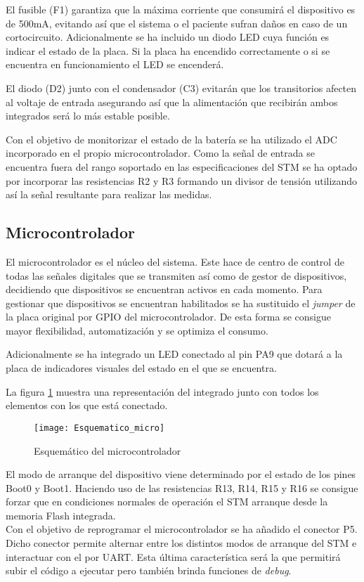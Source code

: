 El fusible (F1) garantiza que la máxima corriente que consumirá el dispositivo es de 500mA, evitando así que el sistema o el paciente sufran daños en caso de un cortocircuito. Adicionalmente se ha incluido un diodo \acrshort{LED} cuya función es indicar el estado de la placa. Si la placa ha encendido correctamente o si se encuentra en funcionamiento el \acrshort{LED} se encenderá.

El diodo (D2) junto con el condensador (C3) evitarán que los transitorios afecten al voltaje de entrada asegurando así que la alimentación que recibirán ambos integrados será lo más estable posible.

Con el objetivo de monitorizar el estado de la batería se ha utilizado el \acrshort{ADC} incorporado en el propio microcontrolador. Como la señal de entrada se encuentra fuera del rango soportado en las especificaciones del STM se ha optado por incorporar las resistencias R2 y R3 formando un divisor de tensión utilizando así la señal resultante para realizar las medidas.

\clearpage

\subsection{Microcontrolador\label{sec:Esquemáticos_micro}}

El microcontrolador es el núcleo del sistema. Este hace de centro de control de todas las señales digitales que se transmiten así como de gestor de dispositivos, decidiendo que dispositivos se encuentran activos en cada momento. 
Para gestionar que dispositivos se encuentran habilitados se ha sustituido el \textit{jumper} de la placa original por \acrshort{GPIO} del microcontrolador. De esta forma se consigue mayor flexibilidad, automatización y se optimiza el consumo. 

Adicionalmente se ha integrado un \acrshort{LED} conectado al pin PA9 que dotará a la placa de indicadores visuales del estado en el que se encuentra.

La figura \ref{fig:Esquematico_micro} muestra una representación del integrado junto con todos los elementos con los que está conectado.

\begin{figure} [h]
    \centering
    \texttt{[image: Esquematico\_micro]}
    \caption{Esquemático del microcontrolador}
    \label{fig:Esquematico_micro}
\end{figure}

El modo de arranque del dispositivo viene determinado por el estado de los pines Boot0 y Boot1. Haciendo uso de las resistencias R13, R14, R15 y R16 se consigue forzar que en condiciones normales de operación el STM arranque desde la memoria Flash integrada. 
\\Con el objetivo de reprogramar el microcontrolador se ha añadido el conector P5. Dicho conector permite alternar entre los distintos modos de arranque del STM e interactuar con el por UART. Esta última característica será la que permitirá subir el código a ejecutar pero también brinda funciones de \textit{debug}.

